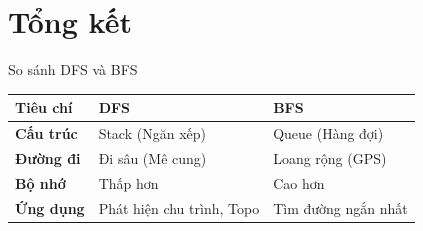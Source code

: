 \section{Tổng kết}
\begin{frame}{So sánh DFS và BFS}
    \centering
    \begin{tabular}{|l|p{3.5cm}|p{3.5cm}|}
        \hline
        \textbf{Tiêu chí} & \textbf{DFS} & \textbf{BFS} \\ \hline
        \textbf{Cấu trúc} & Stack (Ngăn xếp) & Queue (Hàng đợi) \\ \hline
        \textbf{Đường đi} & Đi sâu (Mê cung) & Loang rộng (GPS) \\ \hline
        \textbf{Bộ nhớ} & Thấp hơn & Cao hơn \\ \hline
        \textbf{Ứng dụng} & Phát hiện chu trình, Topo & Tìm đường ngắn nhất \\ \hline
    \end{tabular}
\end{frame}
